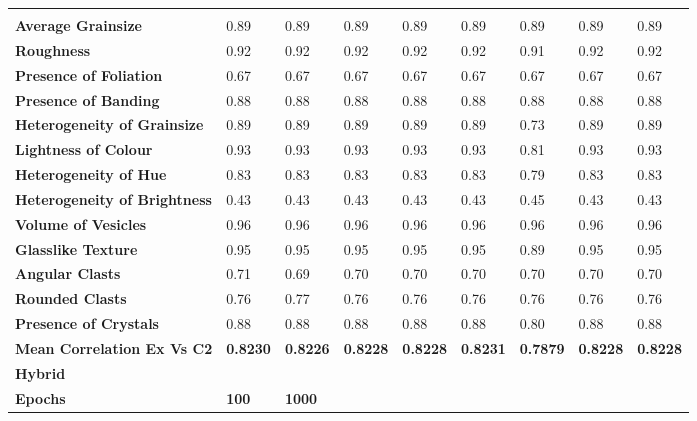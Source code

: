 \begin{longtable}[c]{@{}lllllllll@{}}
  \textbf{} &
  {\color[HTML]{202124} \textbf{}} \\
\textbf{Average Grainsize} &
  0.89 &
  0.89 &
  0.89 &
  0.89 &
  0.89 &
  0.89 &
  0.89 &
  {\color[HTML]{202124} 0.89} \\
\textbf{Roughness} &
  0.92 &
  0.92 &
  0.92 &
  0.92 &
  0.92 &
  0.91 &
  0.92 &
  {\color[HTML]{202124} 0.92} \\
\textbf{Presence of Foliation} &
  0.67 &
  0.67 &
  0.67 &
  0.67 &
  0.67 &
  0.67 &
  0.67 &
  {\color[HTML]{202124} 0.67} \\
\textbf{Presence of Banding} &
  0.88 &
  0.88 &
  0.88 &
  0.88 &
  0.88 &
  0.88 &
  0.88 &
  {\color[HTML]{202124} 0.88} \\
\textbf{Heterogeneity of Grainsize} &
  0.89 &
  0.89 &
  0.89 &
  0.89 &
  0.89 &
  0.73 &
  0.89 &
  0.89 \\
\textbf{Lightness of Colour} &
  0.93 &
  0.93 &
  0.93 &
  0.93 &
  0.93 &
  0.81 &
  0.93 &
  0.93 \\
\textbf{Heterogeneity of Hue} &
  0.83 &
  0.83 &
  0.83 &
  0.83 &
  0.83 &
  0.79 &
  0.83 &
  0.83 \\
\textbf{Heterogeneity of Brightness} &
  0.43 &
  0.43 &
  0.43 &
  0.43 &
  0.43 &
  0.45 &
  0.43 &
  0.43 \\
\textbf{Volume of Vesicles} &
  0.96 &
  0.96 &
  0.96 &
  0.96 &
  0.96 &
  0.96 &
  0.96 &
  0.96 \\
\textbf{Glasslike Texture} &
  0.95 &
  0.95 &
  0.95 &
  0.95 &
  0.95 &
  0.89 &
  0.95 &
  0.95 \\
\textbf{Angular Clasts} &
  0.71 &
  0.69 &
  0.70 &
  0.70 &
  0.70 &
  0.70 &
  0.70 &
  0.70 \\
\textbf{Rounded Clasts} &
  0.76 &
  0.77 &
  0.76 &
  0.76 &
  0.76 &
  0.76 &
  0.76 &
  0.76 \\
\textbf{Presence of Crystals} &
  0.88 &
  0.88 &
  0.88 &
  0.88 &
  0.88 &
  0.80 &
  0.88 &
  0.88 \\
\cellcolor[HTML]{FFFF00}\textbf{Mean Correlation Ex Vs C2} &
  \textbf{0.8230} &
  \textbf{0.8226} &
  \textbf{0.8228} &
  \textbf{0.8228} &
  \textbf{0.8231} &
  \textbf{0.7879} &
  \textbf{0.8228} &
  \textbf{0.8228} \\
\rowcolor[HTML]{E7E6E6} 
\textbf{Hybrid} &
  \textbf{} &
  \textbf{} &
  \textbf{} &
  \textbf{} &
  \textbf{} &
  \textbf{} &
  \textbf{} &
  \textbf{} \\
\textbf{Epochs} &
  \cellcolor[HTML]{FFF2CC}\textbf{100} &
  \cellcolor[HTML]{FFF2CC}\textbf{1000} &

\end{longtable}
